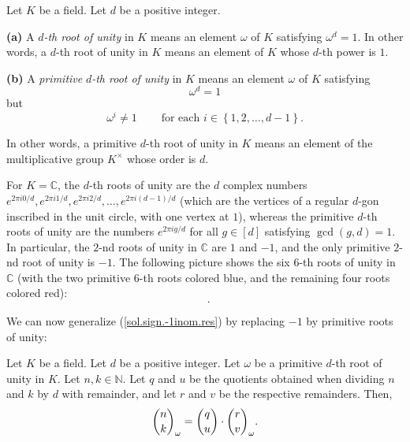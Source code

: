\begin{definition}
\label{def.root-of-unity.prim}Let $K$ be a field. Let $d$ be a positive
integer. \medskip

\textbf{(a)} A\emph{ }$d$\emph{-th root of unity} in $K$ means an element
$\omega$ of $K$ satisfying $\omega^{d}=1$. In other words, a $d$-th root of
unity in $K$ means an element of $K$ whose $d$-th power is $1$. \medskip

\textbf{(b)} A \emph{primitive }$d$\emph{-th root of unity} in $K$ means an
element $\omega$ of $K$ satisfying
\[
\omega^{d}=1
\]
but
\[
\omega^{i}\neq1\ \ \ \ \ \ \ \ \ \ \text{for each }i\in\left\{  1,2,\ldots
,d-1\right\}  .
\]


In other words, a primitive $d$-th root of unity in $K$ means an element of
the multiplicative group $K^{\times}$ whose order is $d$.
\end{definition}

For $K=\mathbb{C}$, the $d$-th roots of unity are the $d$ complex numbers
\newline$e^{2\pi i0/d},e^{2\pi i1/d},e^{2\pi i2/d},\ldots,e^{2\pi i\left(
d-1\right)  /d}$ (which are the vertices of a regular $d$-gon inscribed in the
unit circle, with one vertex at $1$), whereas the primitive $d$-th roots of
unity are the numbers $e^{2\pi ig/d}$ for all $g\in\left[  d\right]  $
satisfying $\gcd\left(  g,d\right)  =1$. In particular, the $2$-nd roots of
unity in $\mathbb{C}$ are $1$ and $-1$, and the only primitive $2$-nd root of
unity is $-1$. The following picture shows the six $6$-th roots of unity in
$\mathbb{C}$ (with the two primitive $6$-th roots colored blue, and the
remaining four roots colored red):%
\[%
\ \ \ .
\]


We can now generalize (\ref{sol.sign.-1inom.res}) by replacing $-1$ by
primitive roots of unity:

\begin{theorem}
\label{thm.sign.q-lucas}Let $K$ be a field. Let $d$ be a
positive integer. Let $\omega$ be a primitive $d$-th root of unity in $K$. Let
$n,k\in\mathbb{N}$. Let $q$ and $u$ be the quotients obtained when dividing
$n$ and $k$ by $d$ with remainder, and let $r$ and $v$ be the respective
remainders. Then,%
\begin{equation}
\dbinom{n}{k}_{\omega}=\dbinom{q}{u}\cdot\dbinom{r}{v}_{\omega}.
\label{eq.thm.sign.q-lucas.eq}%
\end{equation}

\end{theorem}

